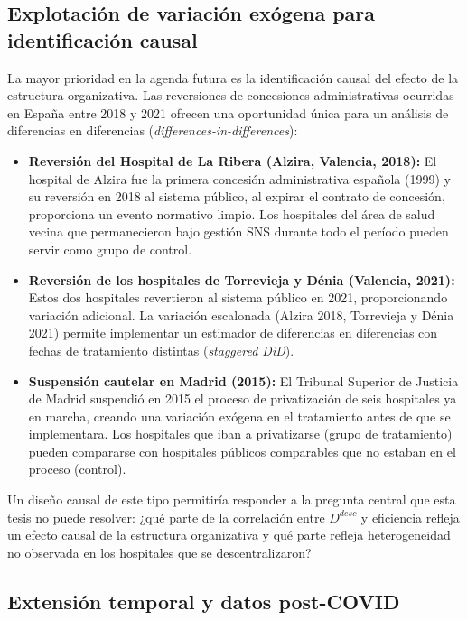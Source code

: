 \documentclass[12pt, a4paper, twoside, openright]{book}
\theoremstyle{plain}
\theoremstyle{definition}
\theoremstyle{remark}
\begin{document}
\subsection{Explotación de variación exógena para identificación causal}

La mayor prioridad en la agenda futura es la identificación causal del efecto de la estructura organizativa. Las reversiones de concesiones administrativas ocurridas en España entre 2018 y 2021 ofrecen una oportunidad única para un análisis de diferencias en diferencias (\textit{differences-in-differences}):

\begin{itemize}
  \item \textbf{Reversión del Hospital de La Ribera (Alzira, Valencia, 2018):} El hospital de Alzira fue la primera concesión administrativa española (1999) y su reversión en 2018 al sistema público, al expirar el contrato de concesión, proporciona un evento normativo limpio. Los hospitales del área de salud vecina que permanecieron bajo gestión SNS durante todo el período pueden servir como grupo de control.
  \item \textbf{Reversión de los hospitales de Torrevieja y Dénia (Valencia, 2021):} Estos dos hospitales revertieron al sistema público en 2021, proporcionando variación adicional. La variación escalonada (Alzira 2018, Torrevieja y Dénia 2021) permite implementar un estimador de diferencias en diferencias con fechas de tratamiento distintas (\textit{staggered DiD}).
  \item \textbf{Suspensión cautelar en Madrid (2015):} El Tribunal Superior de Justicia de Madrid suspendió en 2015 el proceso de privatización de seis hospitales ya en marcha, creando una variación exógena en el tratamiento antes de que se implementara. Los hospitales que iban a privatizarse (grupo de tratamiento) pueden compararse con hospitales públicos comparables que no estaban en el proceso (control).
\end{itemize}

Un diseño causal de este tipo permitiría responder a la pregunta central que esta tesis no puede resolver: ¿qué parte de la correlación entre $D^{desc}$ y eficiencia refleja un efecto causal de la estructura organizativa y qué parte refleja heterogeneidad no observada en los hospitales que se descentralizaron?

\subsection{Extensión temporal y datos post-COVID}
\end{document}
